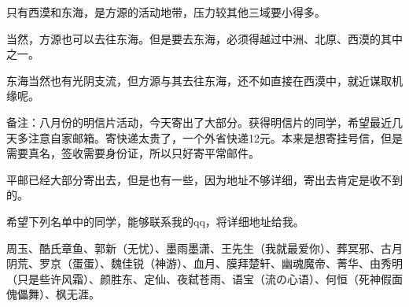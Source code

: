 \begin{this_body}
只有西漠和东海，是方源的活动地带，压力较其他三域要小得多。

当然，方源也可以去往东海。但是要去东海，必须得越过中洲、北原、西漠的其中之一。

东海当然也有光阴支流，但方源与其去往东海，还不如直接在西漠中，就近谋取机缘呢。

备注：八月份的明信片活动，今天寄出了大部分。获得明信片的同学，希望最近几天多注意自家邮箱。寄快递太贵了，一个外省快递12元。本来是想寄挂号信，但是需要真名，签收需要身份证，所以只好寄平常邮件。

平邮已经大部分寄出去，但是也有一些，因为地址不够详细，寄出去肯定是收不到的。

希望下列名单中的同学，能够联系我的qq，将详细地址给我。

周玉、酷氏章鱼、郭新（无忧）、墨雨墨潇、王先生（我就最爱你）、葬冥邪、古月阴荒、罗京（蛋蛋）、魏佳锐（神游）、血月、膜拜楚轩、幽魂魔帝、菁华、由秀明（只是些许风霜）、颜胜东、定仙、夜弑苍雨、语宝（流の心语）、何恒（死神假面傀儡舞）、枫无涯。

\end{this_body}


